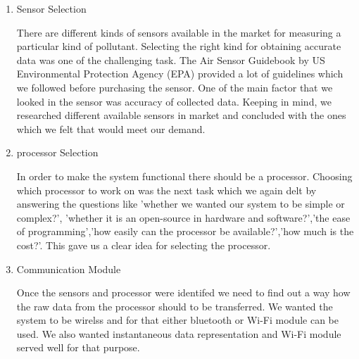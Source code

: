 \begin {enumerate}

\item{Sensor Selection}

There are different kinds of sensors available in the market for measuring a particular kind of pollutant. Selecting the right kind for obtaining accurate data was one of the challenging task. The Air Sensor Guidebook by US Environmental Protection Agency (EPA)\cite{airsensorguidebook} provided a lot of guidelines which we followed before purchasing the sensor. One of the main factor that we looked in the sensor was accuracy of collected data. Keeping in mind, we researched different available sensors in market and concluded with the ones which we felt that would meet our demand. 


\item{processor Selection}

In order to make the system functional there should be a processor. Choosing which processor to work on was the next task which we again delt by answering the questions like 'whether we wanted our system to be simple or complex?', 'whether it is an open-source in hardware and software?','the ease of programming','how easily can the processor be available?','how much is the cost?'. This gave us a clear idea for selecting the processor.


\item{Communication Module}

Once the sensors and processor were identifed we need to find out a way how the raw data from the processor should to be transferred. We wanted the system to be wirelss and for that either bluetooth or Wi-Fi module can be used. We also wanted instantaneous data representation and Wi-Fi module served well for that purpose.

 

\end{enumerate}
